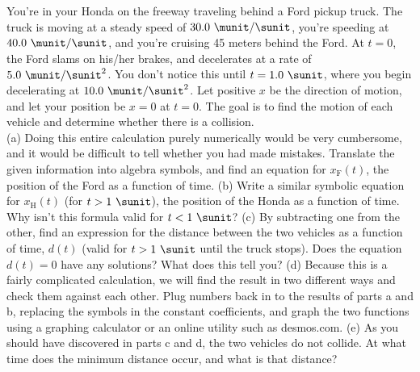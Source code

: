 You're in your Honda on the freeway traveling
behind a Ford pickup truck. The truck is moving at a steady speed of
$30.0\ \munit/\sunit$, you're speeding at $40.0\ \munit/\sunit$, and you're cruising 45
meters behind the Ford. At $t=0$, the Ford slams on his/her brakes,
and decelerates at a rate of $5.0\ \munit/\sunit^2$. You don't notice this
until $t=1.0\ \sunit$, where you begin decelerating at $10.0\ \munit/\sunit^2$.
Let positive $x$ be the direction of motion, and let your position be
$x=0$ at $t=0$. The goal is to find the motion of each vehicle and determine
whether there is a collision.\\
%
(a) Doing this entire calculation purely numerically would be very cumbersome,
and it would be difficult to tell whether you had made mistakes. Translate the
given information into algebra symbols, and
find an equation for $x_\text{F}(t)$, the position of the Ford as a function of time.\answercheck\hwendpart
%
(b) Write a similar symbolic equation for $x_\text{H}(t)$ (for $t > 1\ \sunit$), the
position of the Honda as a function of time. Why isn't this
formula valid for $t < 1\ \sunit$?\answercheck\hwendpart
%
(c) By subtracting one from the other, find an expression for the
distance between the two vehicles as a function of time, $d(t)$
(valid for $t > 1\ \sunit$ until the truck stops). Does the equation
$d(t) = 0$ have any solutions? What does this tell you?\answercheck\hwendpart
%
(d) Because this is a fairly complicated calculation, we will find
the result in two different ways and check them against each other.
Plug numbers back in to the results of parts a and b, replacing the symbols in the constant coefficients,
and graph the two functions using a graphing calculator or an online utility such as desmos.com.
%
(e) As you should have discovered in parts c and d, the two
vehicles do not collide. At what time does the minimum distance occur,
and what is that distance?\answercheck
